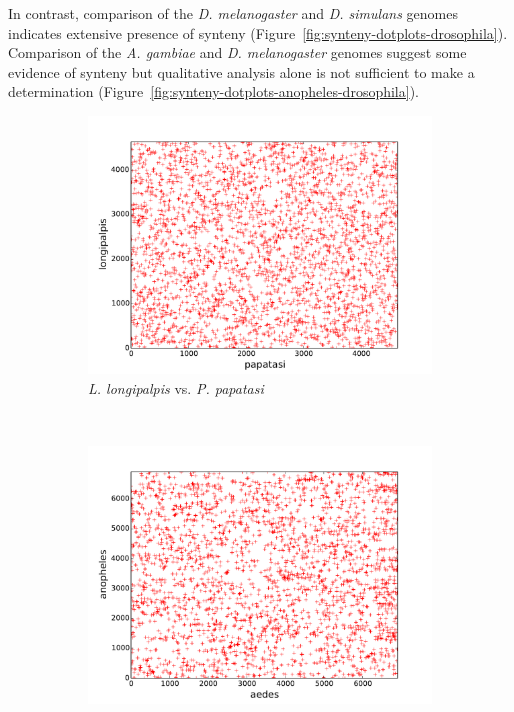 In contrast, comparison of the \emph{D. melanogaster} and \emph{D. simulans} genomes indicates extensive presence of synteny (Figure~\ref{fig:synteny-dotplots-drosophila}).  Comparison of the \emph{A. gambiae} and \emph{D. melanogaster} genomes suggest some evidence of synteny but qualitative analysis alone is not sufficient to make a determination (Figure~\ref{fig:synteny-dotplots-anopheles-drosophila}).


\begin{figure}[H]
  \centering
  \begin{subfigure}[b]{0.45\textwidth}
    \includegraphics[width=\textwidth]{figures/synteny/papatasi_longipalpis_plot}
    \caption{\emph{L. longipalpis} vs. \emph{P. papatasi}}
    \label{fig:synteny-dotplots-sandflies}
  \end{subfigure}
  ~
  \begin{subfigure}[b]{0.45\textwidth}
    \includegraphics[width=\textwidth]{figures/synteny/aedes_anopheles_plot}

\end{subfigure}
\end{figure}
